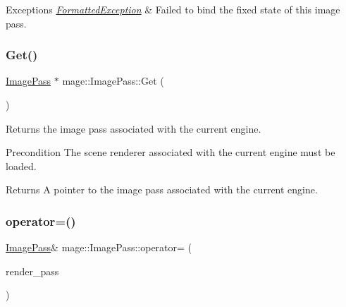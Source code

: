 \begin{DoxyExceptions}{Exceptions}
{\em \hyperlink{structmage_1_1_formatted_exception}{Formatted\+Exception}} & Failed to bind the fixed state of this image pass. \\
\hline
\end{DoxyExceptions}
\hypertarget{classmage_1_1_image_pass_ac0a674ae8f92dc731a2ac6b6df1dee2b}{}\label{classmage_1_1_image_pass_ac0a674ae8f92dc731a2ac6b6df1dee2b} 
\subsubsection{\texorpdfstring{Get()}{Get()}}
{\footnotesize\ttfamily \hyperlink{classmage_1_1_image_pass}{Image\+Pass} $\ast$ mage\+::\+Image\+Pass\+::\+Get (\begin{DoxyParamCaption}{ }\end{DoxyParamCaption})\hspace{0.3cm}{\ttfamily [static]}}

Returns the image pass associated with the current engine.

\begin{DoxyPrecond}{Precondition}
The scene renderer associated with the current engine must be loaded. 
\end{DoxyPrecond}
\begin{DoxyReturn}{Returns}
A pointer to the image pass associated with the current engine. 
\end{DoxyReturn}
\hypertarget{classmage_1_1_image_pass_afc3144652cad2cb7bf88af28c98cf343}{}\label{classmage_1_1_image_pass_afc3144652cad2cb7bf88af28c98cf343} 
\subsubsection{\texorpdfstring{operator=()}{operator=()}\hspace{0.1cm}{\footnotesize\ttfamily [1/2]}}
{\footnotesize\ttfamily \hyperlink{classmage_1_1_image_pass}{Image\+Pass}\& mage\+::\+Image\+Pass\+::operator= (\begin{DoxyParamCaption}\item[{const \hyperlink{classmage_1_1_image_pass}{Image\+Pass} \&}]{render\+\_\+pass }\end{DoxyParamCaption})\hspace{0.3cm}{\ttfamily [delete]}}

